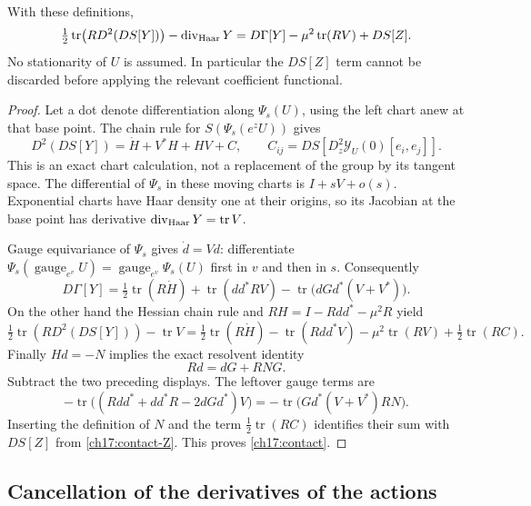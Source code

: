\begin{proposition}
\label{ch17:contact-identity}
With these definitions,
\begin{equation}
 \tfrac12\operatorname{tr}\bigl(RD^2(DS[Y])\bigr)
       -\operatorname{div}_{\rm Haar}Y
       =D\Gamma[Y]-\mu^2\operatorname{tr}(RV)+DS[Z].
 \label{ch17:contact}
\end{equation}
No stationarity of $U$ is assumed. In particular the $DS[Z]$ term
cannot be discarded before applying the relevant coefficient functional.
\end{proposition}
\begin{proof}
Let a dot denote differentiation along $\Psi_s(U)$, using the left
chart anew at that base point. The chain rule for
$S(\Psi_s(e^zU))$ gives
\[
 D^2(DS[Y])=\dot H+V^*H+HV+C,
 \qquad C_{ij}=DS[D_z^2\mathcal Y_U(0)[e_i,e_j]].
\]
This is an exact chart calculation, not a replacement of the group by
its tangent space. The differential of $\Psi_s$ in these moving charts
is $I+sV+o(s)$. Exponential charts have Haar density one at their origins,
so its Jacobian at the base point has derivative
$\operatorname{div}_{\rm Haar}Y=\operatorname{tr}V$.

Gauge equivariance of $\Psi_s$ gives $\dot d=Vd$: differentiate
$\Psi_s(\operatorname{gauge}_{e^v}U)
=\operatorname{gauge}_{e^v}\Psi_s(U)$ first in $v$ and then in $s$.
Consequently
\[
 D\Gamma[Y]=\tfrac12\operatorname{tr}(R\dot H)
       +\operatorname{tr}(dd^*RV)
       -\operatorname{tr}\bigl(dGd^*(V+V^*)\bigr).
\]
On the other hand the Hessian chain rule and
$RH=I-Rdd^*-\mu^2R$ yield
\[
 \tfrac12\operatorname{tr}(RD^2(DS[Y]))-\operatorname{tr}V
 =\tfrac12\operatorname{tr}(R\dot H)
       -\operatorname{tr}(Rdd^*V)-\mu^2\operatorname{tr}(RV)
       +\tfrac12\operatorname{tr}(RC).
\]
Finally $Hd=-N$ implies the exact resolvent identity
\[
                  Rd=dG+RNG.
\]
Subtract the two preceding displays. The leftover gauge terms are
\[
 -\operatorname{tr}\bigl((Rdd^*+dd^*R-2dGd^*)V\bigr)
       =-\operatorname{tr}\bigl(Gd^*(V+V^*)RN\bigr).
\]
Inserting the definition of $N$ and the term $\frac12\operatorname{tr}(RC)$
identifies their sum with $DS[Z]$ from \eqref{ch17:contact-Z}.
This proves \eqref{ch17:contact}.
\end{proof}

\subsection{Cancellation of the derivatives of the actions}

